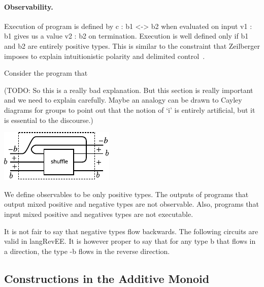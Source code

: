 \documentclass[preprint]{sigplanconf}
\begin{document}
\paragraph*{Observability.} 
Execution of program is defined by {{c : b1 <-> b2}} when evaluated on input
{{v1 : b1}} gives us a value {{v2 : b2}} on termination. Execution is well
defined only if {{b1}} and {{b2}} are entirely positive types. This is
similar to the constraint that Zeilberger imposes to explain intuitionistic
polarity and delimited control~\cite{10.1109/LICS.2010.23}.

Consider the program that

(TODO: So this is a really bad explanation. But this section is really
important and we need to explain carefully. Maybe an analogy can be
drawn to Cayley diagrams for groups to point out that the notion of
`i' is entirely artificial, but it is essential to the discourse.)

\begin{center}
  \includegraphics{diagrams/shuffle.pdf}
\end{center}

We define observables to be only positive types. The outputs of
programs that output mixed positive and negative types are not
observable.  Also, programs that input mixed positive and negatives
types are not executable.

It is not fair to say that negative types flow backwards. The
following circuits are valid in {{langRevEE}}. It is however proper to
say that for any type {{b}} that flows in a direction, the type {{-b}}
flows in the reverse direction.



\subsection{Constructions in the Additive Monoid}
\label{sec:monoidal-constructions}
\end{document}

